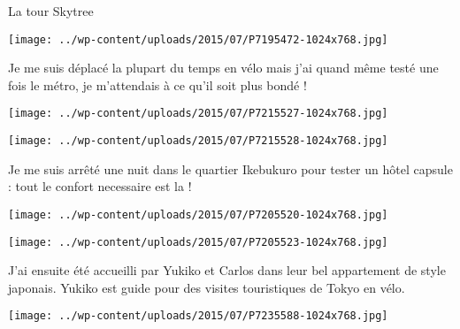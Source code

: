  

 La tour Skytree 

 

\begin{center} \texttt{[image: ../wp-content/uploads/2015/07/P7195472-1024x768.jpg]} \end{center}

 

 Je me suis déplacé la plupart du temps en vélo mais j'ai quand même testé une fois le métro, je m'attendais à ce qu'il soit plus bondé ! 

 

\begin{center} \texttt{[image: ../wp-content/uploads/2015/07/P7215527-1024x768.jpg]} \end{center}

 

 

\begin{center} \texttt{[image: ../wp-content/uploads/2015/07/P7215528-1024x768.jpg]} \end{center}

 

 Je me suis arrêté une nuit dans le quartier Ikebukuro pour tester un hôtel capsule : tout le confort necessaire est la ! 

 

\begin{center} \texttt{[image: ../wp-content/uploads/2015/07/P7205520-1024x768.jpg]} \end{center}

 

 

\begin{center} \texttt{[image: ../wp-content/uploads/2015/07/P7205523-1024x768.jpg]} \end{center}

 

 J'ai ensuite été accueilli par Yukiko et Carlos dans leur bel appartement de style japonais. Yukiko est guide pour des visites touristiques de Tokyo en vélo. 

 

\begin{center} \texttt{[image: ../wp-content/uploads/2015/07/P7235588-1024x768.jpg]} \end{center}

 

 

